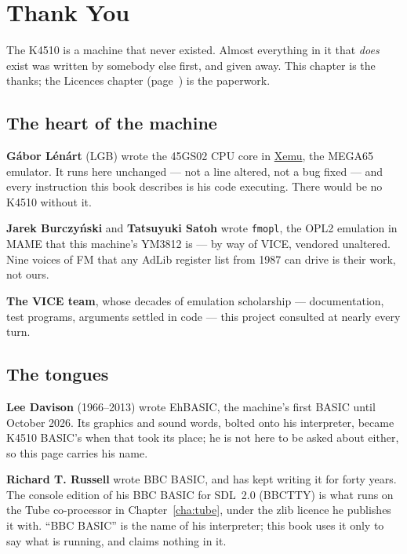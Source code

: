 \chapter{Thank You}\label{cha:thanks}
\begingroup
\setlength{\parindent}{0pt}
\setlength{\parskip}{5pt plus 1.5pt minus 1pt}

The K4510 is a machine that never existed. Almost everything in it
that \emph{does} exist was written by somebody else first, and given
away. This chapter is the thanks; the Licences chapter (page~\pageref{cha:licences})
is the paperwork.

\section{The heart of the machine}
\textbf{Gábor Lénárt} (LGB) wrote the 45GS02 CPU core in
\href{https://github.com/lgblgblgb/xemu}{Xemu}, the MEGA65 emulator.
It runs here unchanged --- not a line altered, not a bug fixed --- and
every instruction this book describes is his code executing. There
would be no K4510 without it.

\textbf{Jarek Burczyński} and \textbf{Tatsuyuki Satoh} wrote
\texttt{fmopl}, the OPL2 emulation in MAME that this machine's YM3812 is
--- by way of VICE, vendored unaltered. Nine voices of FM that any
AdLib register list from 1987 can drive is their work, not ours.

\textbf{The VICE team}, whose decades of emulation scholarship ---
documentation, test programs, arguments settled in code --- this
project consulted at nearly every turn.

\section{The tongues}
\textbf{Lee Davison} (1966--2013) wrote EhBASIC, the machine's first
BASIC until October 2026. Its graphics and sound words, bolted
onto his interpreter, became K4510 BASIC's when that took its place;
he is not here to be asked about either, so this page carries his name.

\textbf{Richard T. Russell} wrote BBC BASIC, and has kept writing it
for forty years. The console edition of his BBC BASIC for SDL~2.0
(BBCTTY) is what runs on the Tube co-processor in
Chapter~\ref{cha:tube}, under the zlib licence he publishes it with.
``BBC BASIC'' is the name of his interpreter; this book uses it only to
say what is running, and claims nothing in it.

